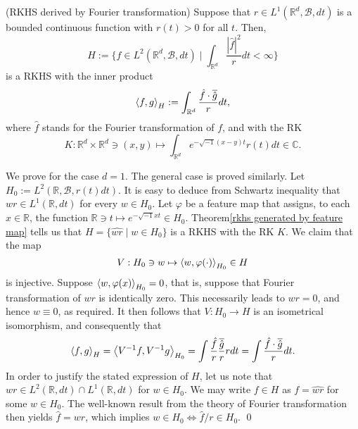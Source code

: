 \documentclass[a4paper,12pt]{article}
\begin{document}
\begin{cor}(RKHS derived by Fourier transformation)\label{rkhs by Fourier}
	Suppose that \( r \in L^1(\mathbb{R}^d, \mathscr{B}, dt) \) is a bounded continuous function with \( r(t) >0 \) for all \( t \).
	Then,
	\[
		H:= \{ f \in L^2(\mathbb{R}^d, \mathscr{B}, dt) \mid \int_{\mathbb{R}^d} \frac{|\hat{f}|^2}{r}   dt < \infty \}
	\]
	is a RKHS with the inner product
	\[
		\left<f, g \right>_H := \int_{\mathbb{R}^d} \frac{\hat{f} \cdot \overline{\hat{g}}}{r} dt,
	\]
	where \( \hat{f} \) stands for the Fourier transformation of \( f \), and with the RK
	\[
		K: \mathbb{R}^d \times \mathbb{R}^d \ni (x,y) \mapsto \int_{\mathbb{R}^d} e^{-\sqrt{-1}(x-y)t} r(t) dt \in \mathbb{C}.
	\]
\end{cor}
\begin{prf}
	We prove for the case \( d = 1 \). The general case is proved similarly.
	Let \( H_0 := L^2(\mathbb{R}, \mathscr{B}, r(t)dt) \). It is easy to deduce from Schwartz inequality that \( wr \in L^1(\mathbb{R}, dt) \) for every \( w \in H_0 \).
	Let \( \varphi \) be a feature map that assigns, to each \( x \in \mathbb{R} \), the function \( \mathbb{R} \ni t \mapsto e^{- \sqrt{-1}xt} \in H_0 \). Theorem\ref{rkhs generated by feature map} tells us that \( H = \{\widehat{wr} \mid w \in H_0\} \) is a RKHS with the RK \( K \). We claim that the map
	\[
		V: H_0 \ni w \mapsto \left<w, \varphi(\cdot ) \right>_{H_0} \in H
	\]
	is injective. Suppose \( \left<w, \varphi(x) \right>_{H_0} = 0 \), that is, suppose that Fourier transformation of \( wr \) is identically zero. This necessarily leads to \( wr = 0 \), and hence \(  w \equiv 0 \), as required.
	It then follows that \( V:H_0 \to H \) is an isometrical isomorphism, and consequently that
	\[
		\left<f, g \right>_H
		= \left<V^{-1}f, V^{-1}g \right>_{H_0}
		= \int \frac{\hat{f}}{r} \frac{\overline{\hat{g}}}{r} r dt
		= \int \frac{\hat{f} \cdot \overline{\hat{g}}}{r} dt.
	\]
	In order to justify the stated expression of \( H \), let us note that \( wr \in L^2(\mathbb{R}, dt)\cap L^1(\mathbb{R}, dt) \) for \( w \in H_0 \).
	We may write \( f \in H \) as \( f = \widehat{wr} \) for some \( w \in H_0 \).
	The well-known result from the theory of Fourier transformation then yields \( \hat{f} = wr \), which implies \( w \in H_0 \iff \hat{f}/r \in H_0 \).
	\qed\end{prf}
\end{document}
